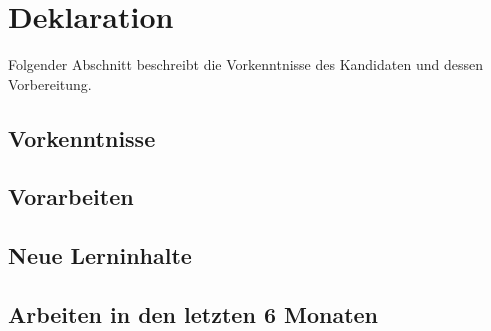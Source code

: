 \chapter{Deklaration}

Folgender Abschnitt beschreibt die Vorkenntnisse des Kandidaten und dessen Vorbereitung.

\section{Vorkenntnisse}

\lipsum[11]

\section{Vorarbeiten}

\lipsum[12]

\section{Neue Lerninhalte}

\lipsum[13]

\section{Arbeiten in den letzten 6 Monaten}

\lipsum[14]
